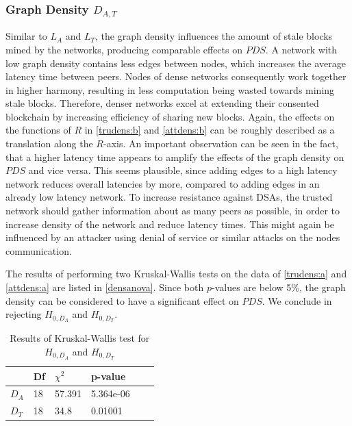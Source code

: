 \documentclass[a4paper,12pt,twoside]{report}
\begin{document}
\subsubsection{Graph Density $D_{A,T}$}
Similar to $L_{A}$ and $L_{T}$, the graph density influences the amount of stale blocks mined by the networks, producing comparable effects on $PDS$. A network with low graph density contains less edges between nodes, which increases the average latency time between peers. Nodes of dense networks consequently work together in higher harmony, resulting in less computation being wasted towards mining stale blocks. Therefore, denser networks excel at extending their consented blockchain by increasing efficiency of sharing new blocks. Again, the effects on the functions of $R$ in \autoref{trudens:b} and \autoref{attdens:b} can be roughly described as a translation along the $R$-axis. An important observation can be seen in the fact, that a higher latency time appears to amplify the effects of the graph density on $PDS$ and vice versa. This seems plausible, since adding edges to a high latency network reduces overall latencies by more, compared to adding edges in an already low latency network. To increase resistance against DSAs, the trusted network should gather information about as many peers as possible, in order to increase density of the network and reduce latency times. This might again be influenced by an attacker using denial of service or similar attacks on the nodes communication.

The results of performing two Kruskal-Wallis tests on the data of \autoref{trudens:a} and \autoref{attdens:a} are listed in \autoref{densanova}. Since both $p$-values are below 5\%, the graph density can be considered to have a significant effect on $PDS$. We conclude in rejecting $H_{0,D_A}$ and $H_{0,D_T}$.
\begin{table}[hb]
\centering
\begin{tabular}{|l|l|l|l|l|l|} \hline
& Df & $\chi^{2}$ & p-value \\ \hline
$D_A$ & 18 &  57.391 & 5.364e-06 \\ \hline
$D_T$ & 18 & 34.8 & 0.01001 \\ \hline
\end{tabular}
\caption{Results of Kruskal-Wallis test for $H_{0,D_A}$ and $H_{0,D_T}$}
\label{densanova}
\end{table}
\end{document}

